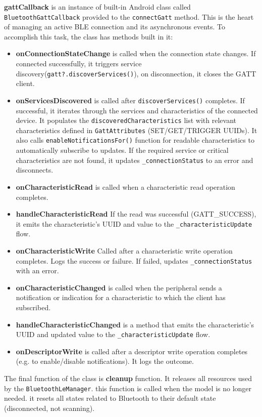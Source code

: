 \textbf{gattCallback} is an instance of built-in Android class called \texttt{BluetoothGattCallback}\cite{android_bluetooth} provided to the \texttt{connectGatt} method. This is the heart of managing an active \ac{BLE} connection and its asynchronous events. To accomplish this task, the class has methods built in it:
\begin{itemize}
	\item \textbf{onConnectionStateChange} is called when the connection state changes. If connected successfully, it triggers service discovery(\texttt{gatt?.discoverServices()}), on disconnection, it closes the \ac{GATT} client.
	\item \textbf{onServicesDiscovered} is called after \texttt{discoverServices()} completes. If successful, it iterates through the services and characteristics of the connected device. It populates the \texttt{discoveredCharacteristics} list with relevant characteristics defined in \texttt{GattAttributes} (SET/GET/TRIGGER UUIDs). It also calls \texttt{enableNotificationsFor()} function for readable characteristics to automatically subscribe to updates. If the required service or critical characteristics are not found, it updates \texttt{\_connectionStatus} to an error and disconnects.
	\item \textbf{onCharacteristicRead} is called when a characteristic read operation completes. 
	\item \textbf{handleCharacteristicRead} If the read was successful (GATT\_SUCCESS), it emits the characteristic's \ac{UUID} and value to the \texttt{\_characteristicUpdate} flow.
	\item \textbf{onCharacteristicWrite} Called after a characteristic write operation completes. Logs the success or failure. If failed, updates \texttt{\_connectionStatus} with an error.
	\item \textbf{onCharacteristicChanged} is called when the peripheral sends a notification or indication for a characteristic to which the client has subscribed. 
	\item \textbf{handleCharacteristicChanged} is a method that emits the characteristic's \ac{UUID} and updated value to the \texttt{\_characteristicUpdate} flow.
	\item \textbf{onDescriptorWrite} is called after a descriptor write operation completes (e.g. to enable/disable notifications). It logs the outcome.
\end{itemize}
The final function of the class is \textbf{cleanup} function. It releases all resources used by the \texttt{BluetoothLeManager}. this function is called when the model is no longer needed. it resets all states related to Bluetooth to their default state (disconnected, not scanning).
